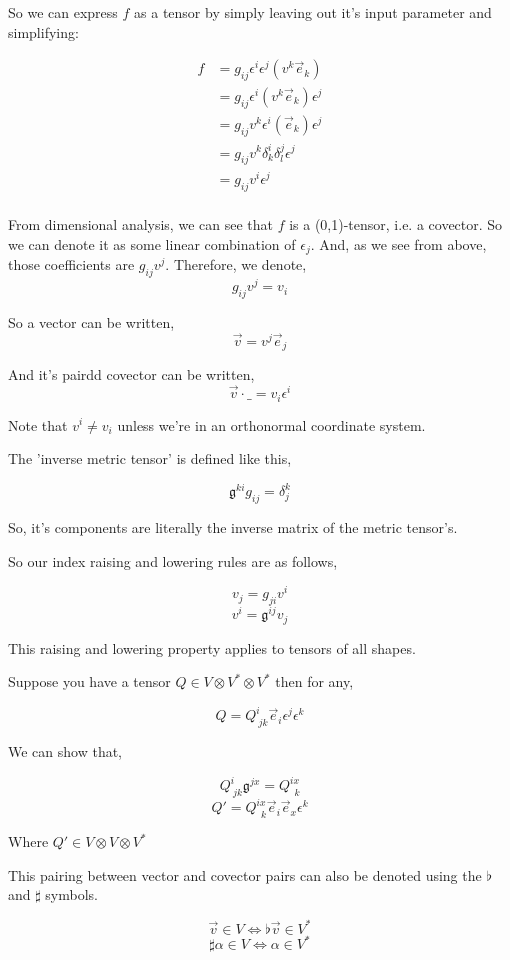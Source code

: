 \documentclass[12pt]{book}
\theoremstyle{plain}
\theoremstyle{definition}
\theoremstyle{ppart}
\theoremstyle{case}
\theoremstyle{solution}
\begin{document}
So we can express $f$ as a tensor by simply leaving out it's input parameter and simplifying:

\begin{align*}
  f &= g_{ij} \epsilon^i \epsilon^j (v^k \vec{e}_k) \\
  &= g_{ij} \epsilon^i (v^k \vec{e}_k) \epsilon^j \\
  &= g_{ij} v^k \epsilon^i (\vec{e}_k) \epsilon^j \\
  &= g_{ij} v^k \delta^i_k \delta^j_l \epsilon^j \\
  &= g_{ij} v^i \epsilon^j \\
\end{align*}

From dimensional analysis, we can see that $f$ is a (0,1)-tensor, i.e. a covector. So we can denote it as
some linear combination of $\epsilon_j$. And, as we see from above, those coefficients are $g_{ij}v^j$. Therefore,
we denote,
\[ g_{ij}v^j = v_i \]

So a vector can be written,
\[ \vec{v} = v^j \vec{e}_j \]

And it's pairdd covector can be written,
\[ \vec{v} \cdot \_ = v_i \epsilon^i \]

Note that $v^i \ne v_i$ unless we're in an orthonormal coordinate system.

The 'inverse metric tensor' is defined like this,

\[ \mathfrak{g}^{ki} g_{ij} = \delta^k_j \]

So, it's components are literally the inverse matrix of the metric tensor's.

So our index raising and lowering rules are as follows,

\[ v_j = g_{ji} v^i \]
\[ v^i = \mathfrak{g}^{ij} v_j \]

This raising and lowering property applies to tensors of all shapes.

Suppose you have a tensor $Q \in V \otimes V^* \otimes V^*$ then for any,

\[ Q = Q^i_{~jk} \vec{e}_i \epsilon^j \epsilon^k \]

We can show that,

\[ Q^i_{~jk} \mathfrak{g}^{jx} = Q^{ix}_{~~k} \]
\[ Q' = Q^{ix}_{~~k} \vec{e}_i \vec{e}_x \epsilon^k \]

Where $Q' \in V \otimes V \otimes V^*$

This pairing between vector and covector pairs can also be denoted using the $\flat$ and $\sharp$ symbols.

\[ \vec{v} \in V \iff \flat \vec{v} \in V^* \]
\[ \sharp \alpha \in V \iff \alpha \in V^* \]
\end{document}
